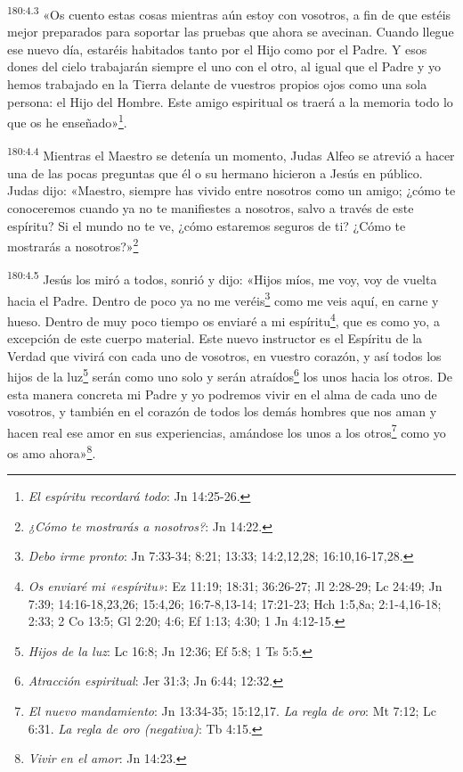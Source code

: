 \par
\textsuperscript{180:4.3} «Os cuento estas cosas mientras aún estoy con vosotros, a fin de que estéis mejor preparados para soportar las pruebas que ahora se avecinan. Cuando llegue ese nuevo día, estaréis habitados tanto por el Hijo como por el Padre. Y esos dones del cielo trabajarán siempre el uno con el otro, al igual que el Padre y yo hemos trabajado en la Tierra delante de vuestros propios ojos como una sola persona: el Hijo del Hombre. Este amigo espiritual os traerá a la memoria todo lo que os he enseñado»\footnote{\textit{El espíritu recordará todo}: Jn 14:25-26.}.

\par
\textsuperscript{180:4.4} Mientras el Maestro se detenía un momento, Judas Alfeo se atrevió a hacer una de las pocas preguntas que él o su hermano hicieron a Jesús en público. Judas dijo: «Maestro, siempre has vivido entre nosotros como un amigo; ¿cómo te conoceremos cuando ya no te manifiestes a nosotros, salvo a través de este espíritu? Si el mundo no te ve, ¿cómo estaremos seguros de ti? ¿Cómo te mostrarás a nosotros?»\footnote{\textit{¿Cómo te mostrarás a nosotros?}: Jn 14:22.}

\par
\textsuperscript{180:4.5} Jesús los miró a todos, sonrió y dijo: «Hijos míos, me voy, voy de vuelta hacia el Padre. Dentro de poco ya no me veréis\footnote{\textit{Debo irme pronto}: Jn 7:33-34; 8:21; 13:33; 14:2,12,28; 16:10,16-17,28.} como me veis aquí, en carne y hueso. Dentro de muy poco tiempo os enviaré a mi espíritu\footnote{\textit{Os enviaré mi «espíritu»}: Ez 11:19; 18:31; 36:26-27; Jl 2:28-29; Lc 24:49; Jn 7:39; 14:16-18,23,26; 15:4,26; 16:7-8,13-14; 17:21-23; Hch 1:5,8a; 2:1-4,16-18; 2:33; 2 Co 13:5; Gl 2:20; 4:6; Ef 1:13; 4:30; 1 Jn 4:12-15.}, que es como yo, a excepción de este cuerpo material. Este nuevo instructor es el Espíritu de la Verdad que vivirá con cada uno de vosotros, en vuestro corazón, y así todos los hijos de la luz\footnote{\textit{Hijos de la luz}: Lc 16:8; Jn 12:36; Ef 5:8; 1 Ts 5:5.} serán como uno solo y serán atraídos\footnote{\textit{Atracción espiritual}: Jer 31:3; Jn 6:44; 12:32.} los unos hacia los otros. De esta manera concreta mi Padre y yo podremos vivir en el alma de cada uno de vosotros, y también en el corazón de todos los demás hombres que nos aman y hacen real ese amor en sus experiencias, amándose los unos a los otros\footnote{\textit{El nuevo mandamiento}: Jn 13:34-35; 15:12,17. \textit{La regla de oro}: Mt 7:12; Lc 6:31. \textit{La regla de oro (negativa)}: Tb 4:15.} como yo os amo ahora»\footnote{\textit{Vivir en el amor}: Jn 14:23.}.

